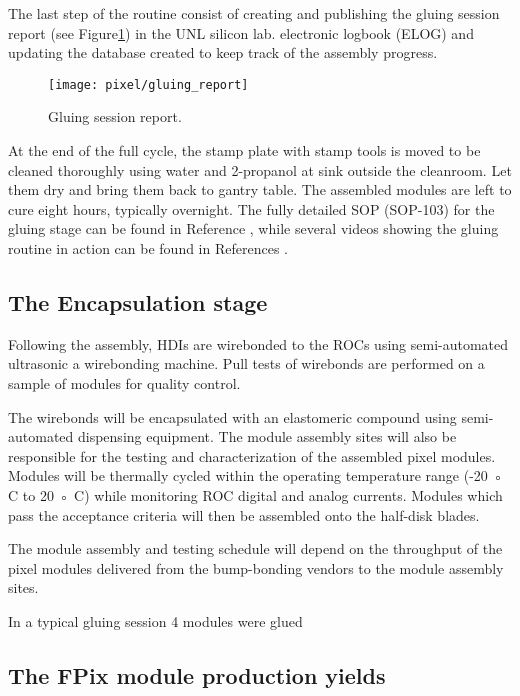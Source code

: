 The last step of the routine consist of creating and publishing the gluing session report (see Figure\ref{fig:gluing_report}) in the UNL silicon lab. electronic logbook (ELOG) and updating the database created to keep track of the assembly progress.  

\begin{figure}[h]
\begin{center}
  \texttt{[image: pixel/gluing\_report]}
 \caption[Gluing session report.]{Gluing session report.}\label{fig:gluing_report}
\end{center}
\end{figure}

At the end of the full cycle, the stamp plate with stamp tools is moved to be cleaned thoroughly using water and 2-propanol at sink outside the cleanroom. Let them dry and bring them back to gantry table. The assembled modules are left to cure eight hours, typically overnight. The fully detailed SOP (SOP-103) for the gluing stage can be found in Reference \cite{sop_103}, while several videos showing the gluing routine in action can be found in References \cite{gluing_frank, jmonroy_channel}. 


\subsection{The Encapsulation stage}

Following the assembly, HDIs are wirebonded to the ROCs using semi-automated ultrasonic a wirebonding machine. Pull tests of wirebonds are performed on a sample of modules for quality control.

The
wirebonds will be encapsulated with an elastomeric compound using
semi-automated dispensing equipment. The module assembly sites will
also be responsible for the testing and characterization of the
assembled pixel modules. Modules will be thermally cycled within the
operating temperature range (-20 ◦ C to 20 ◦ C) while monitoring ROC
digital and analog currents. Modules which pass the acceptance
criteria will then be assembled onto the half-disk blades.

The module assembly and testing schedule will depend on the throughput of the pixel modules delivered from the bump-bonding vendors to the module
assembly sites.

In a typical gluing session 4 modules were glued  









\subsection{The FPix module production yields}

